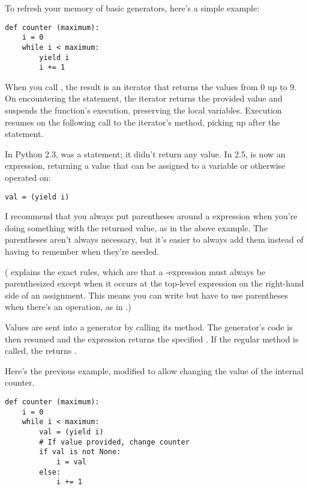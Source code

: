 \documentclass{howto}
\begin{document}
To refresh your memory of basic generators, here's a simple example:

\begin{verbatim}
def counter (maximum):
    i = 0
    while i < maximum:
        yield i
        i += 1
\end{verbatim}

When you call , the result is an iterator that
returns the values from 0 up to 9.  On encountering the
 statement, the iterator returns the provided value and
suspends the function's execution, preserving the local variables.
Execution resumes on the following call to the iterator's 
 method, picking up after the  statement.

In Python 2.3,  was a statement; it didn't return any
value.  In 2.5,  is now an expression, returning a
value that can be assigned to a variable or otherwise operated on:

\begin{verbatim}
val = (yield i)
\end{verbatim}

I recommend that you always put parentheses around a 
expression when you're doing something with the returned value, as in
the above example.  The parentheses aren't always necessary, but it's
easier to always add them instead of having to remember when they're
needed.

( explains the exact rules, which are that a
-expression must always be parenthesized except when it
occurs at the top-level expression on the right-hand side of an
assignment.  This means you can write  but have to
use parentheses when there's an operation, as in .)

Values are sent into a generator by calling its
 method.  The generator's code is then
resumed and the  expression returns the specified
.  If the regular  method is called, the
 returns .

Here's the previous example, modified to allow changing the value of
the internal counter.

\begin{verbatim}
def counter (maximum):
    i = 0
    while i < maximum:
        val = (yield i)
        # If value provided, change counter
        if val is not None:
            i = val
        else:
            i += 1
\end{verbatim}
\end{document}
